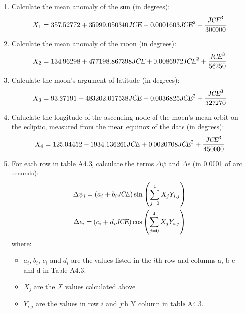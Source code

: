{\begin{enumerate}
\begin{enumerate}
    \item Calculate the mean anomaly of the sun (in degrees):
      \begin{displaymath}
	X_1 = 357.52772 + 35999.050340 \text{\sl JCE} - 0.0001603 \text{\sl JCE}^2 - \frac{\text{\sl JCE}^3}{300000}
      \end{displaymath}

    \item Calculate the mean anomaly of the moon (in degrees):
      \begin{displaymath}
      X_2 = 134.96298 + 477198.867398 \text{\sl JCE} + 0.0086972 \text{\sl JCE}^2 + \frac{\text{\sl JCE}^3}{56250}
      \end{displaymath}

    \item Calculate the moon's argument of latitude (in degrees):
      \begin{displaymath}
      X_3 = 93.27191 + 483202.017538 \text{\sl JCE} - 0.0036825 \text{\sl JCE}^2 + \frac{\text{\sl JCE}^3}{327270}
      \end{displaymath}

    \item Caluclate the longitude of the ascending node of the moon's mean orbit on the ecliptic,
	  measured from the mean equinox of the date (in degrees):
	\begin{displaymath}
	X_4 = 125.04452 - 1934.136261 \text{\sl JCE} + 0.0020708 \text{\sl JCE}^2 + \frac{\text{\sl JCE}^3}{450000}
	\end{displaymath}

    \item For each row in table A4.3, calculate the terms $\Delta \psi$ and $\Delta \epsilon$ (in
	  0.0001 of arc seconds):
	\begin{gather*}
	\Delta \psi_i = (a_i + b_i \text{\sl JCE}) \sin{\left(\sum \limits_{j=0}^4 X_j Y_{i, j}\right)} \\
	\Delta \epsilon_i = (c_i + d_i \text{\sl JCE}) \cos{\left(\sum \limits_{j=0}^4 X_j Y_{i, j}\right)} 
	\end{gather*}
      where:
	\begin{itemize}
	  \item $a_i$, $b_i$, $c_i$ and $d_i$ are the values listed in the $i$th row and columns a, b
		c and d in Table A4.3.
	  \item $X_j$ are the $X$ values calculated above
	  \item $Y_{i, j}$ are the values in row $i$ and $j$th Y column in table A4.3. 
	\end{itemize}


\end{enumerate}
\end{enumerate}}
